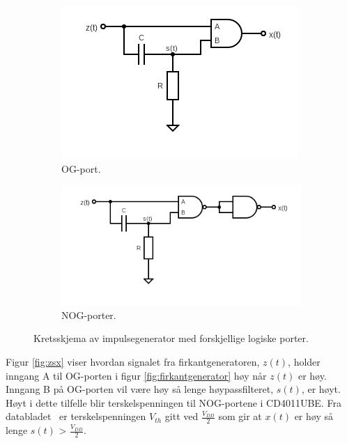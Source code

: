 \documentclass[a4paper,11pt,norsk]{article}
\begin{document}
\begin{figure}[H]
\centering
    \begin{subfigure}{0.45\linewidth}
\includegraphics[width=\linewidth]{D1/Images/impulsegenerator_and.png} 
    \caption{OG-port.}
\label{fig:impulsegenerator1}
    \end{subfigure}\hfill
    \begin{subfigure}{0.55\linewidth}
\includegraphics[width=\linewidth]{D1/Images/impulsegenerator_nand.png}
    \caption{NOG-porter.}
\label{fig:impulsegenerator2}
    \end{subfigure}
\caption{Kretsskjema av impulsegenerator med forskjellige logiske porter.}
    \label{fig:impulsgenerator}
\end{figure}

Figur \ref{fig:zsx} viser hvordan signalet fra firkantgeneratoren, $z(t)$, holder inngang A til OG-porten i figur \ref{fig:firkantgenerator} høy når $z(t)$ er høy. Inngang B på OG-porten vil være høy så lenge høypassfilteret, $s(t)$, er høyt. Høyt i dette tilfelle blir terskelspenningen til NOG-portene i CD4011UBE. Fra databladet~\cite{datablad} er terskelspenningen $V_{th}$ gitt ved $\frac{V_{DD}}{2}$ som gir at $x(t)$ er høy så lenge $s(t)$ > $\frac{V_{DD}}{2}$.
\end{document}
